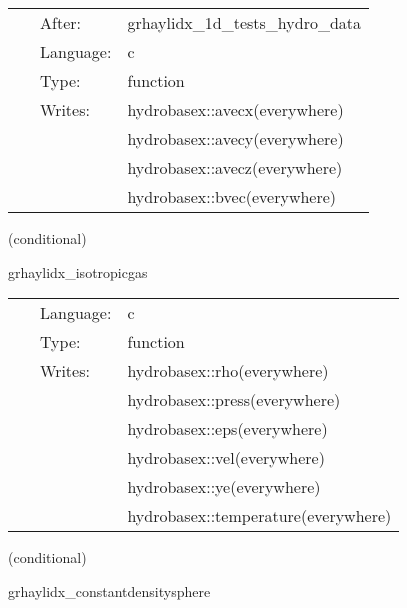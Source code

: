 \hspace{5mm}{\it set initial magnetic data for 1d test } 


\hspace{5mm}

 \begin{tabular*}{160mm}{cll} 
~ & After:  & grhaylidx\_1d\_tests\_hydro\_data \\ 
~ & Language:  & c \\ 
~ & Type:  & function \\ 
~ & Writes:  & hydrobasex::avecx(everywhere) \\ 
~& ~ &hydrobasex::avecy(everywhere)\\ 
~& ~ &hydrobasex::avecz(everywhere)\\ 
~& ~ &hydrobasex::bvec(everywhere)\\ 
\end{tabular*} 


\vspace{5mm}

   (conditional) 

\hspace{5mm} grhaylidx\_isotropicgas 

\hspace{5mm}{\it set initial hydrodynamic data for 1d test } 


\hspace{5mm}

 \begin{tabular*}{160mm}{cll} 
~ & Language:  & c \\ 
~ & Type:  & function \\ 
~ & Writes:  & hydrobasex::rho(everywhere) \\ 
~& ~ &hydrobasex::press(everywhere)\\ 
~& ~ &hydrobasex::eps(everywhere)\\ 
~& ~ &hydrobasex::vel(everywhere)\\ 
~& ~ &hydrobasex::ye(everywhere)\\ 
~& ~ &hydrobasex::temperature(everywhere)\\ 
\end{tabular*} 


\vspace{5mm}

   (conditional) 

\hspace{5mm} grhaylidx\_constantdensitysphere 

\hspace{5mm}{\it set initial hydrodynamic data for 1d test } 


